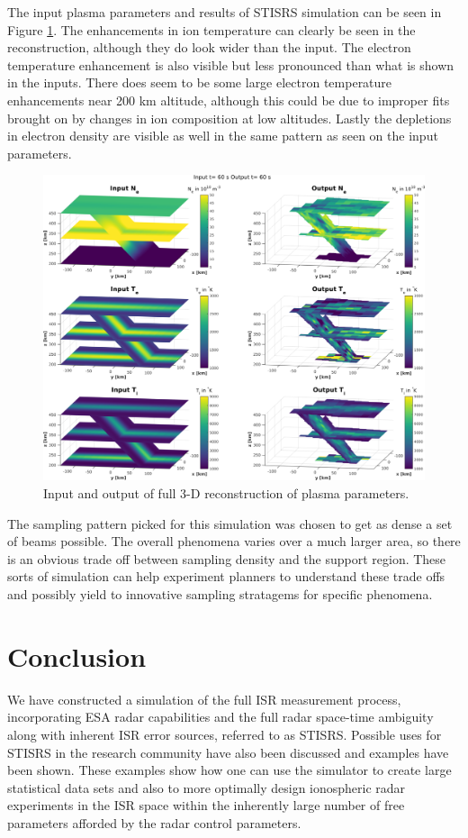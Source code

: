 \documentclass[draft,ras]{agutex}
\begin{document}
\begin{article}
The input plasma parameters and results of STISRS simulation can be seen in Figure \ref{fig:3dparams}. The enhancements in ion temperature can clearly be seen in the reconstruction, although they do look wider than the input. The electron temperature enhancement is also visible but less pronounced than what is shown in the inputs. There does seem to be some large electron temperature enhancements near 200 km altitude, although this could be due to improper fits brought on by changes in ion composition at low altitudes. Lastly the depletions in electron density are visible as well in the same pattern as seen on the input parameters.

\begin{figure}[!t]
\centering
\includegraphics[width=6in]{60_60}
\caption{Input and output of full 3-D reconstruction of plasma parameters.}
\label{fig:3dparams}
\end{figure}

The sampling pattern picked for this simulation was chosen to get as dense a set of beams possible. The overall phenomena varies over a much larger area, so there is an obvious trade off between sampling density and the support region. These sorts of simulation can help experiment planners to understand these trade offs and possibly yield to innovative sampling stratagems for specific phenomena. 
\section{Conclusion}
We have constructed a simulation of the full ISR measurement process, incorporating ESA radar capabilities and the full radar space-time ambiguity along with inherent ISR error sources, referred to as STISRS. Possible uses for STISRS in the research community have also been discussed and examples have been shown. These examples show how one can use the simulator to create large statistical data sets and also to more optimally design ionospheric radar experiments in the ISR space within the inherently large number of free parameters afforded by the radar control parameters. 


\end{article}
\end{document}
